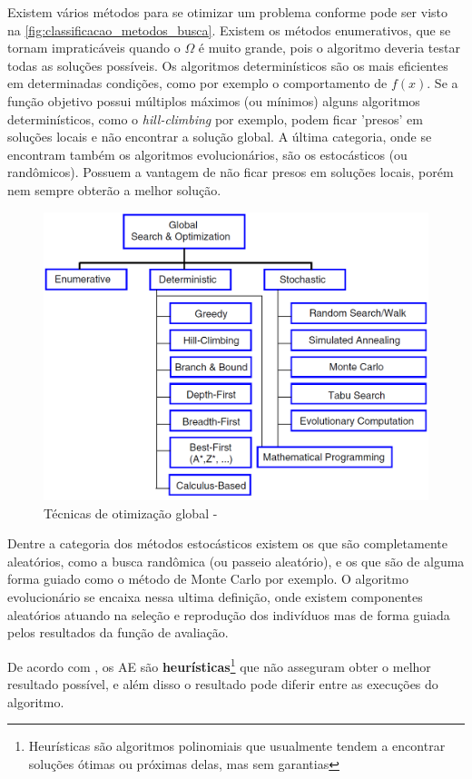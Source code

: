 Existem vários métodos para se otimizar um problema conforme pode ser visto na \autoref{fig:classificacao_metodos_busca}. Existem os métodos enumerativos, que se tornam impraticáveis quando o \(\Omega\) é muito grande, pois o algoritmo deveria testar todas as soluções possíveis. Os algoritmos determinísticos são os mais eficientes em determinadas condições, como por exemplo o comportamento de \(f(x)\). Se a função objetivo possui múltiplos máximos (ou mínimos) alguns algoritmos determinísticos, como o \textit{hill-climbing} por exemplo, podem ficar 'presos' em soluções locais e não encontrar a solução global. A última categoria, onde se encontram também os algoritmos evolucionários, são os estocásticos (ou randômicos). Possuem a vantagem de não ficar presos em soluções locais, porém nem sempre obterão a melhor solução.

\begin{figure}
	\includegraphics[width=\linewidth]{imagens/classificacao_metodos_busca.png}
	\caption{Técnicas de otimização global - \cite{Coello2007}}
	\label{fig:classificacao_metodos_busca}
\end{figure}

Dentre a categoria dos métodos estocásticos existem os que são completamente aleatórios, como a busca randômica (ou passeio aleatório), e os que são de alguma forma guiado como o método de Monte Carlo por exemplo. O algoritmo evolucionário se encaixa nessa ultima definição, onde existem componentes aleatórios atuando na seleção e reprodução dos indivíduos mas de forma guiada pelos resultados da função de avaliação.

De acordo com \citeauthor{Linden2008}, os AE são \textbf{heurísticas}\footnote{Heurísticas são algoritmos polinomiais que usualmente tendem a encontrar soluções ótimas ou próximas delas, mas sem garantias} que não asseguram obter o melhor resultado possível, e além disso o resultado pode diferir entre as execuções do algoritmo.

